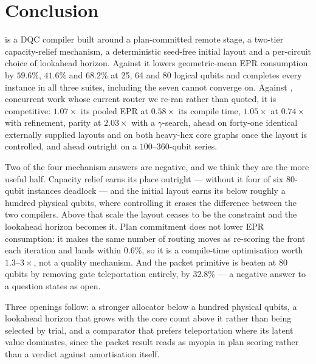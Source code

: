 \section{Conclusion}
\label{sec:conclusion}

\PORTER{} is a DQC compiler built around a plan-committed remote stage,
a two-tier capacity-relief mechanism, a deterministic seed-free initial
layout and a per-circuit choice of lookahead horizon. Against
\TeleSABRE{} it lowers geometric-mean EPR consumption by $59.6\%$,
$41.6\%$ and $68.2\%$ at 25, 64 and 80 logical qubits and completes
every instance in all three suites, including the seven \TeleSABRE{}
cannot converge on. Against \dSABRE{}, concurrent work whose current
router we re-ran rather than quoted, it is competitive: $1.07\times$
its pooled EPR at $0.58\times$ its compile time, $1.05\times$ at
$0.74\times$ with refinement, parity at $2.03\times$ with a
$\gamma$-search, ahead on forty-one identical externally supplied
layouts and on both heavy-hex core graphs once the layout is
controlled, and ahead outright on a $100$--$360$-qubit series.

Two of the four mechanism answers are negative, and we think they are
the more useful half. Capacity relief earns its place outright ---
without it four of six 80-qubit instances deadlock --- and the initial
layout earns its below roughly a hundred physical qubits, where
controlling it erases the difference between the two compilers. Above
that scale the layout ceases to be the constraint and the lookahead
horizon becomes it. Plan commitment does not lower
EPR consumption: it makes the same number of routing moves as
re-scoring the front each iteration and lands within $0.6\%$, so it is
a compile-time optimisation worth $1.3$--$3\times$, not a quality
mechanism. And the packet primitive is beaten at 80 qubits by removing
gate teleportation entirely, by $32.8\%$ --- a negative answer to a
question \dSABRE{} states as open.

Three openings follow: a stronger allocator below a hundred physical
qubits, a lookahead horizon that grows with the core count above it
rather than being selected by trial, and a comparator that
prefers teleportation where its latent value dominates, since the
packet result reads as myopia in plan scoring rather than a verdict
against amortisation itself.
